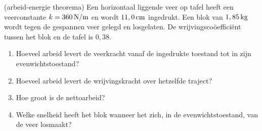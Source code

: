 \documentclass{ximera}
\begin{document}
	\begin{exercise}(arbeid-energie theorema)
	Een horizontaal liggende veer op tafel heeft een veerconstante $k=360\rm\,N/m$ en wordt $11,0\rm\,cm$ ingedrukt. Een blok van $1,85\rm\,kg$ wordt tegen de gespannen veer gelegd en losgelaten. De wrijvingscoöefficiënt tussen het blok en de tafel is $0,38$.
	\begin{enumerate}
	\item Hoeveel arbeid levert de veerkracht vanaf de ingedrukte toestand tot in zijn evenwichtstoestand?
	\item Hoeveel arbeid levert de wrijvingskracht over hetzelfde traject?
	\item Hoe groot is de nettoarbeid?
	\item Welke snelheid heeft het blok wanneer het zich, in de evenwichtstoestand, van de veer losmaakt?
	\end{enumerate}
	\end{exercise}
	
	
	
	
\end{document}
